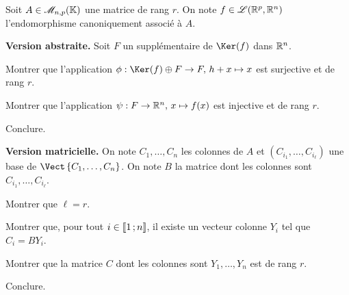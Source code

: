 \begin{exercice}
Soit $A \in \mathscr{M}_{n,p}(\mathbb{K})$ une matrice de rang $r$. On note $f \in \mathscr{L}(\mathbb{R}^p, \mathbb{R}^n)$ l'endomorphisme canoniquement associé à $A$.
\begin{questions}
\item \textbf{Version abstraite.} Soit $F$ un supplémentaire de $\Ker(f)$ dans $\mathbb{R}^n$.
\begin{questions}
\item Montrer que l'application $\phi : \Ker(f) \oplus F \to F,\, h + x \mapsto x$ est surjective et de rang $r$.

\item Montrer que l'application $\psi : F \to \mathbb{R}^n,\, x \mapsto f(x)$ est injective et de rang $r$.

\item Conclure.
\end{questions}
\item \textbf{Version matricielle.} On note $C_1,\ldots,C_n$ les colonnes de $A$ et $(C_{i_1},\ldots,C_{i_\ell})$ une base de $\Vect\left\{C_1,\ldots,C_n\right\}$. On note $B$ la matrice dont les colonnes sont $C_{i_1},\ldots,C_{i_\ell}$.
\begin{questions}
\item Montrer que $\ell = r$.

\item Montrer que, pour tout $i \in \llbracket 1\,; n \rrbracket$, il existe un vecteur colonne $Y_i$ tel que $C_i = B Y_i$.

\item Montrer que la matrice $C$ dont les colonnes sont $Y_1,\ldots,Y_n$ est de rang $r$.

\item Conclure.
\end{questions}
\end{questions}
\end{exercice}

